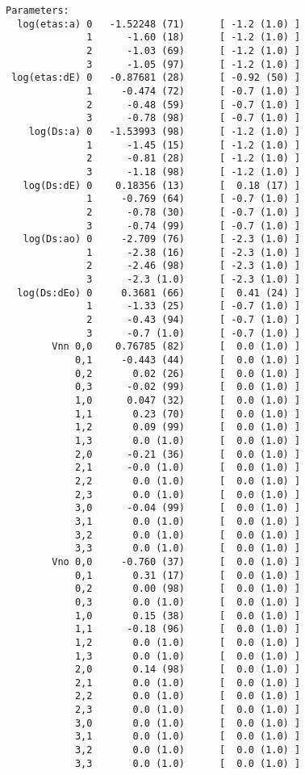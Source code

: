 \documentclass[letterpaper,10pt,english]{sphinxmanual}
\begin{document}
\begin{itemize}
\begin{Verbatim}[commandchars=\\\{\}]
Parameters:
  log(etas:a) 0   -1.52248 (71)      [ -1.2 (1.0) ]  
              1      -1.60 (18)      [ -1.2 (1.0) ]  
              2      -1.03 (69)      [ -1.2 (1.0) ]  
              3      -1.05 (97)      [ -1.2 (1.0) ]  
 log(etas:dE) 0   -0.87681 (28)      [ -0.92 (50) ]  
              1     -0.474 (72)      [ -0.7 (1.0) ]  
              2      -0.48 (59)      [ -0.7 (1.0) ]  
              3      -0.78 (98)      [ -0.7 (1.0) ]  
    log(Ds:a) 0   -1.53993 (98)      [ -1.2 (1.0) ]  
              1      -1.45 (15)      [ -1.2 (1.0) ]  
              2      -0.81 (28)      [ -1.2 (1.0) ]  
              3      -1.18 (98)      [ -1.2 (1.0) ]  
   log(Ds:dE) 0    0.18356 (13)      [  0.18 (17) ]  
              1     -0.769 (64)      [ -0.7 (1.0) ]  
              2      -0.78 (30)      [ -0.7 (1.0) ]  
              3      -0.74 (99)      [ -0.7 (1.0) ]  
   log(Ds:ao) 0     -2.709 (76)      [ -2.3 (1.0) ]  
              1      -2.38 (16)      [ -2.3 (1.0) ]  
              2      -2.46 (98)      [ -2.3 (1.0) ]  
              3      -2.3 (1.0)      [ -2.3 (1.0) ]  
  log(Ds:dEo) 0     0.3681 (66)      [  0.41 (24) ]  
              1      -1.33 (25)      [ -0.7 (1.0) ]  
              2      -0.43 (94)      [ -0.7 (1.0) ]  
              3      -0.7 (1.0)      [ -0.7 (1.0) ]  
        Vnn 0,0    0.76785 (82)      [  0.0 (1.0) ]  
            0,1     -0.443 (44)      [  0.0 (1.0) ]  
            0,2       0.02 (26)      [  0.0 (1.0) ]  
            0,3      -0.02 (99)      [  0.0 (1.0) ]  
            1,0      0.047 (32)      [  0.0 (1.0) ]  
            1,1       0.23 (70)      [  0.0 (1.0) ]  
            1,2       0.09 (99)      [  0.0 (1.0) ]  
            1,3       0.0 (1.0)      [  0.0 (1.0) ]  
            2,0      -0.21 (36)      [  0.0 (1.0) ]  
            2,1      -0.0 (1.0)      [  0.0 (1.0) ]  
            2,2       0.0 (1.0)      [  0.0 (1.0) ]  
            2,3       0.0 (1.0)      [  0.0 (1.0) ]  
            3,0      -0.04 (99)      [  0.0 (1.0) ]  
            3,1       0.0 (1.0)      [  0.0 (1.0) ]  
            3,2       0.0 (1.0)      [  0.0 (1.0) ]  
            3,3       0.0 (1.0)      [  0.0 (1.0) ]  
        Vno 0,0     -0.760 (37)      [  0.0 (1.0) ]  
            0,1       0.31 (17)      [  0.0 (1.0) ]  
            0,2       0.00 (98)      [  0.0 (1.0) ]  
            0,3       0.0 (1.0)      [  0.0 (1.0) ]  
            1,0       0.15 (38)      [  0.0 (1.0) ]  
            1,1      -0.18 (96)      [  0.0 (1.0) ]  
            1,2       0.0 (1.0)      [  0.0 (1.0) ]  
            1,3       0.0 (1.0)      [  0.0 (1.0) ]  
            2,0       0.14 (98)      [  0.0 (1.0) ]  
            2,1       0.0 (1.0)      [  0.0 (1.0) ]  
            2,2       0.0 (1.0)      [  0.0 (1.0) ]  
            2,3       0.0 (1.0)      [  0.0 (1.0) ]  
            3,0       0.0 (1.0)      [  0.0 (1.0) ]  
            3,1       0.0 (1.0)      [  0.0 (1.0) ]  
            3,2       0.0 (1.0)      [  0.0 (1.0) ]  
            3,3       0.0 (1.0)      [  0.0 (1.0) ]  


\end{Verbatim}
\end{itemize}
\end{document}
